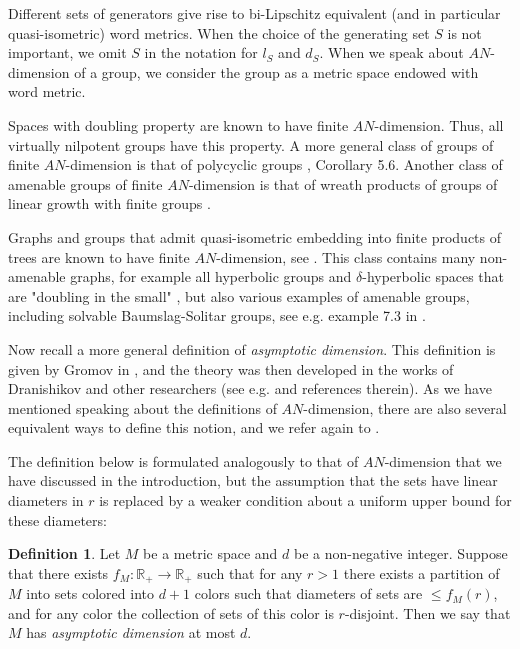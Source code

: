 \documentclass{amsart}
\numberwithin{figure}{section}
\theoremstyle{plain}
\theoremstyle{definition}
\newtheorem{definition}[thm]{Definition}
\begin{document}
Different sets of generators give rise to bi-Lipschitz equivalent (and in particular quasi-isometric) word metrics. 
When the choice of the generating set $S$ is not important, we omit $S$ in the notation for
$l_S$ and $d_S$. When we speak about $AN$-dimension of a group, we consider the group as a metric space endowed with word metric. 

Spaces with doubling property \cite{LangSchlichenmaier} are known to have finite $AN$-dimension. Thus, all virtually nilpotent groups have this property. 
A more general class of groups of finite $AN$-dimension is that of polycyclic groups \cite{HigesPeng}, Corollary 5.6.
Another class
of amenable groups 
of finite $AN$-dimension is that of 
wreath products of groups of linear growth with finite groups \cite{BrodskiyDydakLang}.

Graphs and groups that admit quasi-isometric embedding into finite products of trees 
are known to have finite $AN$-dimension, see \cite{BuyaloDranishnikovSchroeder}. This class contains many non-amenable graphs, for example all hyperbolic groups and $\delta$-hyperbolic spaces that are "doubling in the small" \cite{LangSchlichenmaier},
but also various examples of amenable groups, including solvable Baumslag-Solitar groups, see e.g.
example 7.3 in \cite{nowak}.

Now recall a more general definition of {\it asymptotic dimension}. 
This definition is given by Gromov in \cite{gromovasymptotic}, and the theory was then developed in the works of Dranishikov and other researchers (see e.g.
\cite{BellDranishnikovBedlewo} and references therein). As we have mentioned speaking about the definitions of $AN$-dimension, there are also several equivalent ways to define this notion, and we refer again to \cite{BellDranishnikovBedlewo}.


The definition below is formulated analogously to that of $AN$-dimension that we have discussed in the introduction, but the assumption that the sets have linear diameters  in $r$ is replaced by a weaker condition about a uniform upper bound for these diameters:
\begin{definition}
Let $M$ be a metric space and $d $ be a non-negative integer.
Suppose that there exists $f_M:\mathbb{R}_+\to\mathbb{R}_+$ such that for any $r>1$
there exists a partition of $M$ into sets colored into $d+1$ colors such that diameters of sets are $\leqslant f_M(r)$, and for any color the collection of sets of this color is $r$-disjoint. 
Then we say that $M$ has {\it asymptotic dimension} at most $d$. 
\end{definition}
\end{document}
